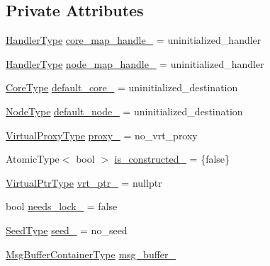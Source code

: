 \subsection*{Private Attributes}
\begin{DoxyCompactItemize}
\item 
\hyperlink{namespacevt_af64846b57dfcaf104da3ef6967917573}{Handler\+Type} \hyperlink{structvt_1_1vrt_1_1_virtual_info_adfae65c8e45c5ffaa98136fe322e7159}{core\+\_\+map\+\_\+handle\+\_\+} = uninitialized\+\_\+handler
\item 
\hyperlink{namespacevt_af64846b57dfcaf104da3ef6967917573}{Handler\+Type} \hyperlink{structvt_1_1vrt_1_1_virtual_info_aff33eb14fb253110c9e1e11d85061187}{node\+\_\+map\+\_\+handle\+\_\+} = uninitialized\+\_\+handler
\item 
\hyperlink{namespacevt_a74b11b22c02feaabab8591acc87c7c52}{Core\+Type} \hyperlink{structvt_1_1vrt_1_1_virtual_info_af708e80cfd5b57bba690af59d0eead21}{default\+\_\+core\+\_\+} = uninitialized\+\_\+destination
\item 
\hyperlink{namespacevt_a866da9d0efc19c0a1ce79e9e492f47e2}{Node\+Type} \hyperlink{structvt_1_1vrt_1_1_virtual_info_aab9e25f18e560b403b3f62ebea9f8233}{default\+\_\+node\+\_\+} = uninitialized\+\_\+destination
\item 
\hyperlink{namespacevt_a1b417dd5d684f045bb58a0ede70045ac}{Virtual\+Proxy\+Type} \hyperlink{structvt_1_1vrt_1_1_virtual_info_a21017982fd772d1ac2afc6aa7f5959dc}{proxy\+\_\+} = no\+\_\+vrt\+\_\+proxy
\item 
Atomic\+Type$<$ bool $>$ \hyperlink{structvt_1_1vrt_1_1_virtual_info_a62c12903d373affd5c1d8a0f042392c4}{is\+\_\+constructed\+\_\+} = \{false\}
\item 
\hyperlink{structvt_1_1vrt_1_1_virtual_info_aede28e76785423dd2685fe4cf54afa21}{Virtual\+Ptr\+Type} \hyperlink{structvt_1_1vrt_1_1_virtual_info_ab8a5fcddd4869b90ec10c243efc8d1f4}{vrt\+\_\+ptr\+\_\+} = nullptr
\item 
bool \hyperlink{structvt_1_1vrt_1_1_virtual_info_a809cb8200de743c2ff7970baa50f99ee}{needs\+\_\+lock\+\_\+} = false
\item 
\hyperlink{namespacevt_ae2e13198bdef4d5b8e603d6c1c7f0969}{Seed\+Type} \hyperlink{structvt_1_1vrt_1_1_virtual_info_aaecc2238b249b5a4a91af1e467fc1d44}{seed\+\_\+} = no\+\_\+seed
\item 
\hyperlink{structvt_1_1vrt_1_1_virtual_info_a0f7b9bd9d5ae38c1e9df13e946b21814}{Msg\+Buffer\+Container\+Type} \hyperlink{structvt_1_1vrt_1_1_virtual_info_ad8c0bf11f1dceb5891d08e3aaf6a2d95}{msg\+\_\+buffer\+\_\+}
\end{DoxyCompactItemize}
